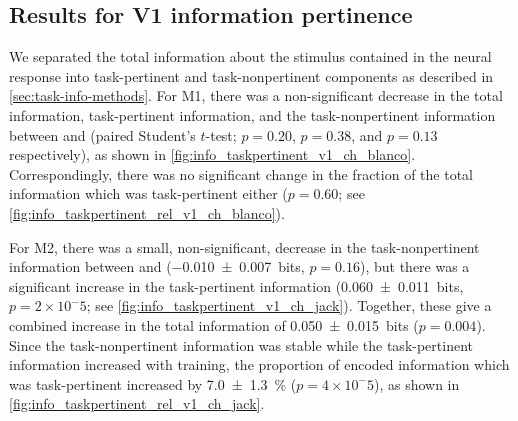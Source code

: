 \subsection{Results for \acs{V1} information pertinence}

We separated the total information about the stimulus contained in the neural response into task-pertinent and task-nonpertinent components as described in \autoref{sec:task-info-methods}.
For \ac{M1}, there was a non-significant decrease in the total information, task-pertinent information, and the task-nonpertinent information between  and  (paired Student's $t$-test; $p=0.20$, $p=0.38$, and $p=0.13$ respectively), as shown in \autoref{fig:info_taskpertinent_v1_ch_blanco}.
Correspondingly, there was no significant change in the fraction of the total information which was task-pertinent either ($p=0.60$; see \autoref{fig:info_taskpertinent_rel_v1_ch_blanco}).

For \ac{M2}, there was a small, non-significant, decrease in the task-nonpertinent information between  and  (\SI{-0.010\pm0.007}{bits}, $p=0.16$), but there was a significant increase in the task-pertinent information (\SI{+0.060\pm0.011}{bits}, $p = 2 \times 10^-5$; see \autoref{fig:info_taskpertinent_v1_ch_jack}).
Together, these give a combined increase in the total information of \SI{+0.050\pm0.015}{bits} ($p=0.004$).
Since the task-nonpertinent information was stable while the task-pertinent information increased with training, the proportion of encoded information which was task-pertinent increased by \SI{+7.0\pm1.3}{\percent} ($p = 4 \times 10^-5$), as shown in \autoref{fig:info_taskpertinent_rel_v1_ch_jack}.

%
%
%
%

